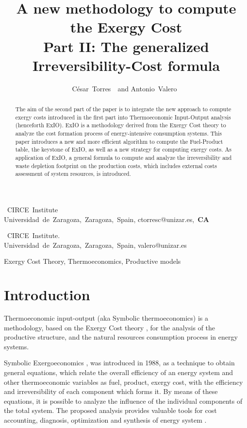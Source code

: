 \documentclass{ecos2018}
\title{A new methodology to compute the Exergy Cost\\ Part II: The generalized Irreversibility-Cost formula}
\author{%
      \mbox{C\'esar Torres \refauth{a}}~and
      \mbox{Antonio Valero \refauth{b}}}
\begin{document}
\maketitle

\begin{address}
 \mbox{ CIRCE Institute} \\
 \mbox{Universidad de Zaragoza, Zaragoza, Spain,}
 \mbox{ctorresc@unizar.es, \textbf{CA}} \par
 \mbox{ CIRCE Institute.} \\
 \mbox{Universidad de Zaragoza, Zaragoza, Spain,}
 \mbox{valero@unizar.es} \par
\end{address}

\begin{abstract}%
\begin{spacing}{1.1}
The aim of the second part of the paper is to integrate the new approach to compute exergy costs introduced in the first part into Thermoeconomic Input-Output analysis (henceforth ExIO). ExIO is a methodology derived from the Exergy Cost theory to analyze the cost formation process of energy-intensive
consumption systems. This paper introduces a new and more efficient algorithm to compute the Fuel-Product table, the keystone of ExIO, as well as a new strategy for computing exergy costs.
As application of ExIO, a general formula to compute and analyze the irreversibility and waste depletion footprint on the production costs, which includes external costs assessment of system resources, is introduced.
\end{spacing}
\end{abstract}

\begin{keywords}
Exergy Cost Theory, Thermoeconomics, Productive models
\end{keywords}

\section{Introduction}
Thermoeconomic input-output (aka Symbolic thermoeconomics) is a methodology, based on the Exergy Cost theory \cite{Torres2017}, for the analysis of the productive structure, and the natural resources consumption process in energy systems.

Symbolic Exergoeconomics \cite{Torres1988}, was introduced in 1988, as a technique to obtain general equations, which relate the overall efficiency of an energy system and other thermoeconomic variables as fuel, product, exergy cost, with the efficiency and irreversibility of each component which forms it. By means of these equations, it is possible to analyze the influence of the individual components of the total system. The proposed analysis provides valuable tools for cost accounting, diagnosis, optimization and synthesis of energy system \cite{TADEUS2004,ISE2010}.
\end{document}
